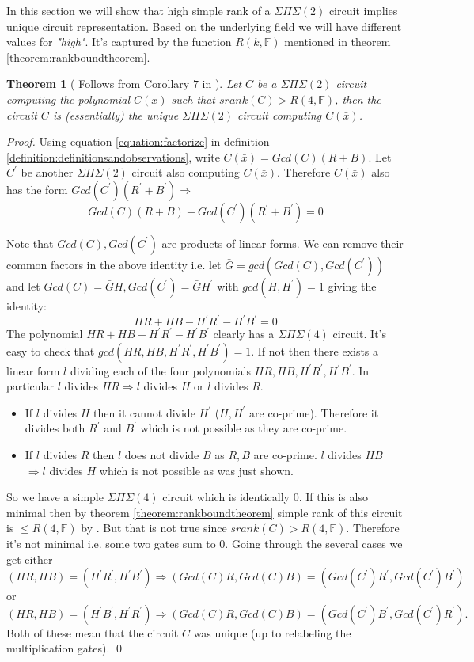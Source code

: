 \documentclass[12pt]{caltech_thesis}
\theoremstyle{plain}
\newtheorem{theorem}{Theorem}
\theoremstyle{definition}
\newcommand{\F}{\mathbb{F}}
\newcommand{\B}[1]{\bar{#1}}
\begin{document}
In this section we will show that high simple rank of a $\Sigma\Pi\Sigma(2)$ circuit implies unique circuit representation. 
Based on the underlying field
we will have different values for \emph{"high"}. It's captured by the function $R(k,\F)$ mentioned in theorem 
\ref{theorem:rankboundtheorem}.


\begin{theorem}[ Follows from Corollary $7$ in \cite{Shpilka07}]\label{theorem:uniqueness}
 Let $C$ be a $\Sigma\Pi\Sigma(2)$ circuit computing the polynomial $C(\B{x})$ such that $srank(C) > R(4,\F)$, 
 then the circuit $C$ is (essentially) the unique
 $\Sigma\Pi\Sigma(2)$ circuit computing $C(\B{x})$.
\end{theorem}
\emph{Proof.} Using equation \ref{equation:factorize} in definition \ref{definition:definitionsandobservations}, 
write $C(\B{x}) = Gcd(C)(R+B)$. Let $C^\prime$ be another $\Sigma\Pi\Sigma(2)$ circuit 
also computing $C(\B{x})$. Therefore $C(\B{x})$ also has the form $Gcd(C^\prime)(R^\prime + B^\prime ) \Rightarrow$ 
\[
 Gcd(C)(R + B ) -
 Gcd(C^\prime)(R^\prime + B^\prime) = 0
\]

Note that $Gcd(C),Gcd(C^\prime)$ are products of linear forms. We can remove their common factors in the above identity i.e.
let $\B{G} = gcd(Gcd(C),Gcd(C^\prime))$
and let $Gcd(C) = \B{G} H, Gcd(C^\prime) = \B{G}H^\prime$ with $gcd(H,H^\prime)=1$ giving the identity:
\[
 HR + HB - H^\prime R^\prime - H^\prime B^\prime = 0
\]
The polynomial $HR + HB - H^\prime R^\prime - H^\prime B^\prime$ clearly has a $\Sigma\Pi\Sigma(4)$ circuit. It's easy to check that
$gcd(HR,HB, H^\prime R^\prime, H^\prime B^\prime) = 1$. If not then there exists a   linear form $l$ dividing each of the four
polynomials $HR,HB, H^\prime R^\prime,H^\prime B^\prime$. In particular $l$ divides $HR \Rightarrow l$ divides $H$ or $l$ divides $R$.
\begin{itemize}
\item If $l$ divides $H$
then it cannot divide $H^\prime$ ($H,H^\prime$ are co-prime). Therefore it divides both $R^\prime$ and $B^\prime$ which is not possible as they
are co-prime.
\item If $l$ divides $R$ then $l$ does not divide $B$ as $R,B$ are co-prime. $l$ divides $HB$ $\Rightarrow l$ divides $H$ 
which is not possible as was just shown.
\end{itemize}

  So we have a simple $\Sigma\Pi\Sigma(4)$
circuit which is identically $0$. If this is also minimal then by theorem \ref{theorem:rankboundtheorem} simple rank of this circuit 
is $\leq R(4,\F)$ by \cite{SS10} . But that
is not true since $srank(C) >R(4,\F)$. Therefore it's not minimal i.e. some two gates sum to $0$. Going through the several cases we get
either
\[
(HR,HB) = (H^\prime R^\prime, H^\prime B^\prime) \Rightarrow (Gcd(C)R,Gcd(C)B) = (Gcd(C^\prime) R^\prime, Gcd(C^\prime) B^\prime)
\]
or
\[
(HR,HB) = (H^\prime B^\prime, H^\prime R^\prime) \Rightarrow (Gcd(C)R,Gcd(C)B) = (Gcd(C^\prime) B^\prime, Gcd(C^\prime) R^\prime).
\]
Both of these mean  that the circuit $C$ was unique (up to relabeling the multiplication gates).
\qed
\end{document}
